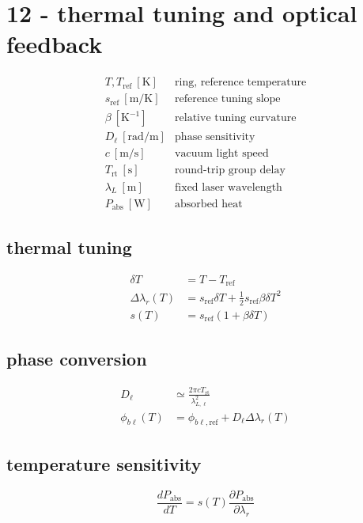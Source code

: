 \section*{12 - thermal tuning and optical feedback}

\[
\begin{array}{ll}T,T_{\mathrm{ref}}\ [\mathrm K]&\text{ring, reference temperature}\\[0.6em]s_{\mathrm{ref}}\ [\mathrm{m/K}]&\text{reference tuning slope}\\[0.6em]\beta\ [\mathrm{K}^{-1}]&\text{relative tuning curvature}\\[0.6em]D_\ell\ [\mathrm{rad/m}]&\text{phase sensitivity}\\[0.6em]c\ [\mathrm{m/s}]&\text{vacuum light speed}\\[0.6em]T_{\mathrm{rt}}\ [\mathrm s]&\text{round-trip group delay}\\[0.6em]\lambda_L\ [\mathrm m]&\text{fixed laser wavelength}\\[0.6em]P_{\mathrm{abs}}\ [\mathrm W]&\text{absorbed heat}\end{array}
\]

\subsection*{thermal tuning}
\[
\displaystyle \begin{aligned}\delta T&=T-T_{\mathrm{ref}}\\\Delta\lambda_r(T)&=s_{\mathrm{ref}}\delta T+\tfrac12s_{\mathrm{ref}}\beta\delta T^2\\s(T)&=s_{\mathrm{ref}}(1+\beta\delta T)\end{aligned}
\]

\subsection*{phase conversion}
\[
\displaystyle \begin{aligned}D_\ell&\simeq\frac{2\pi cT_{\mathrm{rt}}}{\lambda_{L,\ell}^2}\\\phi_{b\ell}(T)&=\phi_{b\ell,\mathrm{ref}}+D_\ell\Delta\lambda_r(T)\end{aligned}
\]

\subsection*{temperature sensitivity}
\[
\displaystyle \frac{dP_{\mathrm{abs}}}{dT}=s(T)\frac{\partial P_{\mathrm{abs}}}{\partial\lambda_r}
\]
